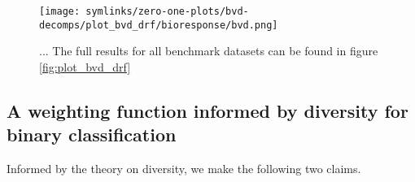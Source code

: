 \documentclass[../main.tex]{subfiles}
\begin{document}





\begin{figure*}
    \texttt{[image: symlinks/zero-one-plots/bvd-decomps/plot\_bvd\_drf/bioresponse/bvd.png]}
    \caption{
        ...
        The full results for all benchmark datasets can be found in figure \ref{fig:plot_bvd_drf}
    }
    \label{fig:drf-comparison}
\end{figure*}

\subsection{A weighting function informed by diversity for binary classification}
Informed by the theory on diversity, we make the following two claims.
\end{document}
